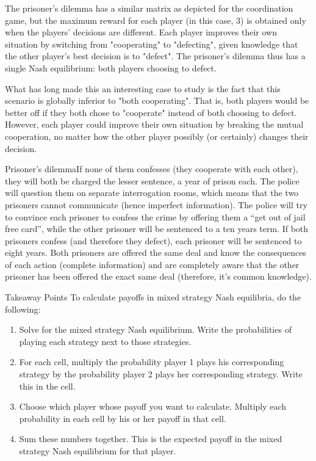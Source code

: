 \documentclass[]{report}
\begin{document}
The prisoner's dilemma has a similar matrix as depicted for the coordination game, but the maximum reward for each player (in this case, 3) is obtained only when the players' decisions are different. Each player improves their own situation by switching from "cooperating" to "defecting", given knowledge that the other player's best decision is to "defect". The prisoner's dilemma thus has a single Nash equilibrium: both players choosing to defect.

What has long made this an interesting case to study is the fact that this scenario is globally inferior to "both cooperating". That is, both players would be better off if they both chose to "cooperate" instead of both choosing to defect. However, each player could improve their own situation by breaking the mutual cooperation, no matter how the other player possibly (or certainly) changes their decision.




Prisoner's dilemmaIf none of them confesses (they cooperate with each other), they will both be charged the lesser sentence, a year of prison each. The police will question them on separate interrogation rooms, which means that the two prisoners cannot communicate (hence imperfect information). The police will try to convince each prisoner to confess the crime by offering them a “get out of jail free card”, while the other prisoner will be sentenced to a ten years term. If both prisoners confess (and therefore they defect), each prisoner will be sentenced to eight years. Both prisoners are offered the same deal and know the consequences of each action (complete information) and are completely aware that the other prisoner has been offered the exact same deal (therefore, it’s common knowledge).

Takeaway Points
To calculate payoffs in mixed strategy Nash equilibria, do the following:

\begin{enumerate}
	\item Solve for the mixed strategy Nash equilibrium. Write the probabilities of playing each strategy next to those strategies.
	\item	For each cell, multiply the probability player 1 plays his corresponding strategy by the probability player 2 plays her corresponding strategy. Write this in the cell.
	\item	Choose which player whose payoff you want to calculate. Multiply each probability in each cell by his or her payoff in that cell.
	\item	Sum these numbers together. This is the expected payoff in the mixed strategy Nash equilibrium for that player.
\end{enumerate}
\end{document}
